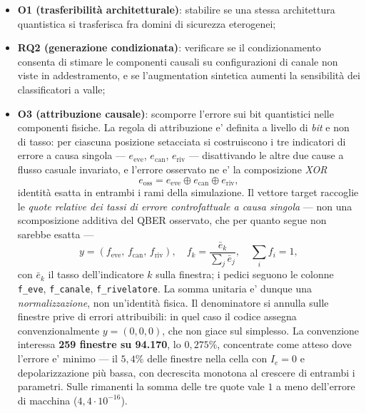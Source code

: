 \documentclass[10pt,conference,a4paper,twocolumn]{IEEEtran}
\begin{document}
\begin{itemize}
    \item \textbf{O1 (trasferibilità architetturale)}: stabilire se una stessa architettura quantistica si trasferisca fra domini di sicurezza eterogenei;
    \item \textbf{RQ2 (generazione condizionata)}: verificare se il condizionamento consenta di stimare le componenti causali su configurazioni di canale non viste in addestramento, e se l'augmentation sintetica aumenti la sensibilità dei classificatori a valle;
    \item \textbf{O3 (attribuzione causale)}: scomporre l'errore sui bit quantistici nelle componenti fisiche. La regola di attribuzione e' definita a livello di \emph{bit} e non di tasso: per ciascuna posizione setacciata si costruiscono i tre indicatori di errore a causa singola — $e_{\text{eve}}$, $e_{\text{can}}$, $e_{\text{riv}}$ — disattivando le altre due cause a flusso casuale invariato, e l'errore osservato ne e' la composizione \emph{XOR}
          \begin{equation}
              e_{\text{oss}} = e_{\text{eve}} \oplus e_{\text{can}} \oplus e_{\text{riv}},
              \label{eq:xor}
          \end{equation}
          identità esatta in entrambi i rami della simulazione. Il vettore target raccoglie le \emph{quote relative dei tassi di errore controfattuale a causa singola} — non una scomposizione additiva del QBER osservato, che per quanto segue non sarebbe esatta —
          \begin{equation}
              y = (f_{\text{eve}},\, f_{\text{can}},\, f_{\text{riv}}), \quad
              f_k = \frac{\bar{e}_k}{\textstyle\sum_j \bar{e}_j}, \quad \textstyle\sum_i f_i = 1,
              \label{eq:frazioni}
          \end{equation}
          con $\bar{e}_k$ il tasso dell'indicatore $k$ sulla finestra; i pedici seguono le colonne \texttt{f\_eve}, \texttt{f\_canale}, \texttt{f\_rivelatore}. La somma unitaria e' dunque una \emph{normalizzazione}, non un'identità fisica. Il denominatore si annulla sulle finestre prive di errori attribuibili: in quel caso il codice assegna convenzionalmente $y=(0,0,0)$, che non giace sul simplesso. La convenzione interessa \textbf{259 finestre su 94.170}, lo $0{,}275\%$, concentrate come atteso dove l'errore e' minimo — il $5{,}4\%$ delle finestre nella cella con $I_e = 0$ e depolarizzazione più bassa, con decrescita monotona al crescere di entrambi i parametri. Sulle rimanenti la somma delle tre quote vale $1$ a meno dell'errore di macchina ($4{,}4 \cdot 10^{-16}$).
\end{itemize}
\end{document}
